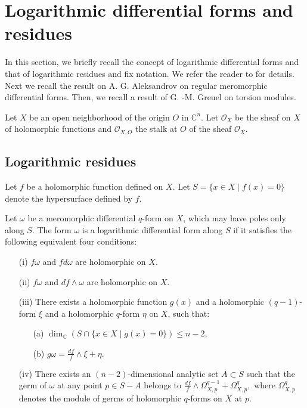 \documentclass[pdftex]{arxsigma}
\begin{document}
\section{Logarithmic differential forms and residues}

In this section, we briefly recall the concept of logarithmic differential forms and that of logarithmic residues and fix notation. We refer the reader to 
\cite{S} for details. Next we recall the result on A. G. Aleksandrov on regular meromorphic differential forms. Then, we recall a result of 
G. -M. Greuel on torsion modules. 


Let $X$ be an open neighborhood of the origin $O$ in $ {\mathbb C}^n$.  Let $ {\mathcal O}_X $ be the sheaf on $ X $ of holomorphic functions and $ {\mathcal O}_{X,O} $ the stalk at $ O $ of the sheaf $ {\mathcal O}_X$.

\subsection{Logarithmic residues}

Let $f$ be a holomorphic function defined on $X$. Let $S=\{ x \in X \mid f(x)=0 \} $ denote the hypersurface  defined by $ f$. 

\begin{definition}
Let $\omega $ be a meromorphic differential $q$-form on $X$, which may have poles only along $S$. The form $\omega$ is a logarithmic differential form along $S$ if it satisfies the following equivalent four conditions:
\begin{enumerate}
\item[(i)] $f\omega$ and $fd\omega$ are holomorphic on $X$.

\item[(ii)] $f\omega$ and $df \wedge \omega$ are holomorphic on $X$.

\item[(iii)] There exists a holomorphic function $g(x)$ and a holomorphic $(q-1)$-form $\xi$  and a holomorphic $q$-form $\eta$ on $X$, 
such that:
\begin{enumerate}
\item[ (a)] $ \dim_{\mathbb C}( S \cap \{x  \in X \mid g(x)=0 \}) \leq n-2, $

\item[ (b)] $ {\displaystyle g\omega = \frac{df}{f} \wedge \xi + \eta.}$
\end{enumerate}
\item[(iv)] There exists an $ (n-2)$-dimensional analytic set $A \subset S$ such that the germ of $\omega$ at any point $ p \in S-A$ belongs to $ {\displaystyle \frac{df}{f} \wedge \Omega_{X, p}^{q-1} + \Omega_{X,p}^{q}},$ where $ \Omega_{X,p}^{q}$ denotes the module of germs of holomorphic $q$-forms on $X$ at $p.$
\end{enumerate}
\end{definition}
\end{document}
